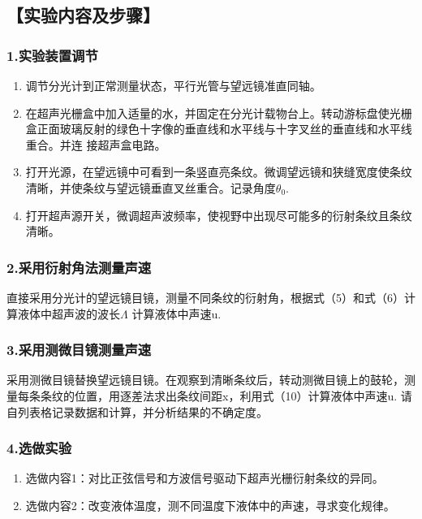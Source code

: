 \documentclass[12pt,a4paper,UTF8]{ctexart}
\begin{document}
\subsection*{【实验内容及步骤】}

\subsubsection*{1.实验装置调节}
    \begin{enumerate}
		\item 调节分光计到正常测量状态，平行光管与望远镜准直同轴。
		\item 在超声光栅盒中加入适量的水，并固定在分光计载物台上。转动游标盘使光栅盒正面玻璃反射的绿色十字像的垂直线和水平线与十字叉丝的垂直线和水平线重合。并连
		接超声盒电路。
		\item 打开光源，在望远镜中可看到一条竖直亮条纹。微调望远镜和狭缝宽度使条纹清晰，并使条纹与望远镜垂直叉丝重合。记录角度$\theta_0$.
		\item 打开超声源开关，微调超声波频率，使视野中出现尽可能多的衍射条纹且条纹清晰。
	\end{enumerate}

\subsubsection*{2.采用衍射角法测量声速}

直接采用分光计的望远镜目镜，测量不同条纹的衍射角，根据式（5）和式（6）计算液体中超声波的波长$\varLambda$ 计算液体中声速u.
\subsubsection*{3.采用测微目镜测量声速}

采用测微目镜替换望远镜目镜。在观察到清晰条纹后，转动测微目镜上的鼓轮，测量每条条纹的位置，用逐差法求出条纹间距x，利用式（10）计算液体中声速u.
请自列表格记录数据和计算，并分析结果的不确定度。

\subsubsection*{4.选做实验}
    \begin{enumerate}
		\item 选做内容1：对比正弦信号和方波信号驱动下超声光栅衍射条纹的异同。
		\item 选做内容2：改变液体温度，测不同温度下液体中的声速，寻求变化规律。		
	\end{enumerate}
\end{document}
